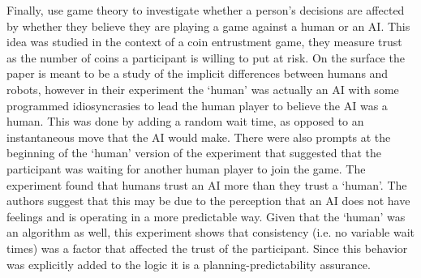 Finally, \citet{Wu2016-ei} use game theory to investigate whether a person's decisions are affected by whether they believe they are playing a game against a human or an AI. This idea was studied in the context of a coin entrustment game, they measure trust as the number of coins a participant is willing to put at risk. On the surface the paper is meant to be a study of the implicit differences between humans and robots, however in their experiment the `human' was actually an AI with some programmed idiosyncrasies to lead the human player to believe the AI was a human. This was done by adding a random wait time, as opposed to an instantaneous move that the AI would make. There were also prompts at the beginning of the `human' version of the experiment that suggested that the participant was waiting for another human player to join the game. The experiment found that humans trust an AI more than they trust a `human'. The authors suggest that this may be due to the perception that an AI does not have feelings and is operating in a more predictable way. Given that the `human' was an algorithm as well, this experiment shows that consistency (i.e. no variable wait times) was a factor that affected the trust of the participant. Since this behavior was explicitly added to the logic it is a planning-predictability assurance. 
